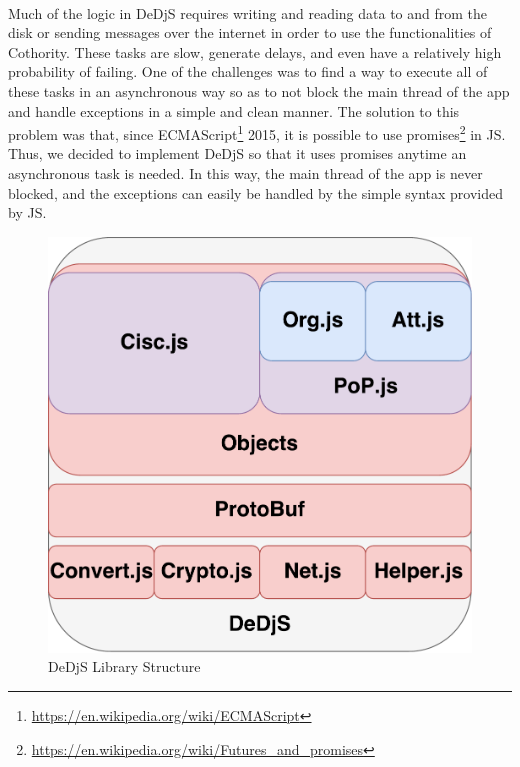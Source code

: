 \paragraph{}
Much of the logic in DeDjS requires writing and reading data to and from the disk or sending messages over the internet in order to use the functionalities of Cothority. These tasks are slow, generate delays, and even have a relatively high probability of failing. One of the challenges was to find a way to execute all of these tasks in an asynchronous way so as to not block the main thread of the app and handle exceptions in a simple and clean manner. The solution to this problem was that, since ECMAScript\footnote{\url{https://en.wikipedia.org/wiki/ECMAScript}} 2015, it is possible to use promises\footnote{\url{https://en.wikipedia.org/wiki/Futures_and_promises}} in JS. Thus, we decided to implement DeDjS so that it uses promises anytime an asynchronous task is needed. In this way, the main thread of the app is never blocked, and the exceptions can easily be handled by the simple syntax provided by JS.

\begin{figure}[h]
\includegraphics[scale=.5]{graphic/dedjs.pdf}
\centering
\caption{DeDjS Library Structure}
\end{figure}
